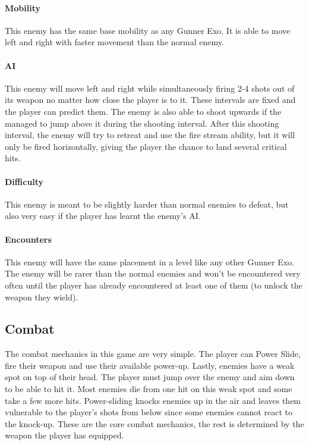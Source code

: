 \documentclass[12pt]{article}
\begin{document}
\paragraph{Mobility}

This enemy has the same base mobility as any Gunner Exo. It is able to move left and right with faster movement than the normal enemy.

\paragraph{AI}

This enemy will move left and right while simultaneously firing 2-4 shots out of its weapon no matter how close the player is to it. These intervals are fixed and the player can predict them. The enemy is also able to shoot upwards if the managed to jump above it during the shooting interval. After this shooting interval, the enemy will try to retreat and use the fire stream ability, but it will only be fired horizontally, giving the player the chance to land several critical hits. 

\paragraph{Difficulty}

This enemy is meant to be slightly harder than normal enemies to defeat, but also very easy if the player has learnt the enemy's AI. 

\paragraph{Encounters}

This enemy will have the same placement in a level like any other Gunner Exo. The enemy will be rarer than the normal enemies and won't be encountered very often until the player has already encountered at least one of them (to unlock the weapon they wield). 

\subsection{Combat}

The combat mechanics in this game are very simple. The player can Power Slide, fire their weapon and use their available power-up. Lastly, enemies have a weak spot on top of their head. The player must jump over the enemy and aim down to be able to hit it. Most enemies die from one hit on this weak spot and some take a few more hits. Power-sliding knocks enemies up in the air and leaves them vulnerable to the player's shots from below since some enemies cannot react to the knock-up.
These are the core combat mechanics, the rest is determined by the weapon the player has equipped.
\end{document}
